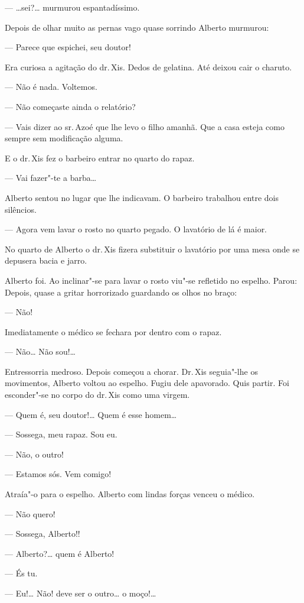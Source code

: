 --- \ldots{}sei?\ldots{} murmurou espantadíssimo.

Depois de olhar muito as pernas vago quase sorrindo Alberto murmurou:

--- Parece que espichei, seu doutor!

Era curiosa a agitação do dr.\,Xis. Dedos de gelatina. Até deixou cair o
charuto.

--- Não é nada. Voltemos.

--- Não começaste ainda o relatório?

--- Vais dizer ao sr.\,Azoé que lhe levo o filho amanhã. Que a casa
esteja como sempre sem modificação alguma.

E o dr.\,Xis fez o barbeiro entrar no quarto do rapaz.

--- Vai fazer"-te a barba\ldots{}

Alberto sentou no lugar que lhe indicavam. O barbeiro trabalhou entre
dois silêncios.

--- Agora vem lavar o rosto no quarto pegado. O lavatório de lá é maior.

No quarto de Alberto o dr.\,Xis fizera substituir o lavatório por uma
mesa onde se depusera bacia e jarro.

Alberto foi. Ao inclinar"-se para lavar o rosto viu"-se refletido no
espelho. Parou: Depois, quase a gritar horrorizado guardando os olhos no
braço:

--- Não!

Imediatamente o médico se fechara por dentro com o rapaz.

--- Não\ldots{} Não sou!\ldots{}

Entressorria medroso. Depois começou a chorar. Dr.\,Xis seguia"-lhe os
movimentos, Alberto voltou ao espelho. Fugiu dele apavorado. Quis
partir. Foi esconder"-se no corpo do dr.\,Xis como uma virgem.

--- Quem é, seu doutor!\ldots{} Quem é esse homem\ldots{}

--- Sossega, meu rapaz. Sou eu.

--- Não, o outro!

--- Estamos sós. Vem comigo!

Atraía"-o para o espelho. Alberto com lindas forças venceu o médico.

--- Não quero!

--- Sossega, Alberto!!

--- Alberto?\ldots{} quem é Alberto!

--- És tu.

--- Eu!\ldots{} Não! deve ser o outro\ldots{} o moço!\ldots{}

